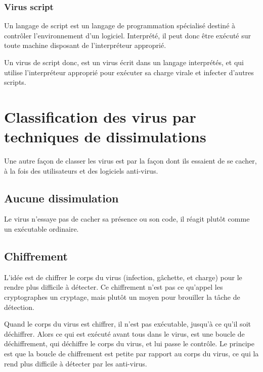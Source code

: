         \subsubsection{Virus script}
        Un langage de script est un langage de programmation spécialisé destiné à contrôler l'environnement 
        d'un logiciel. Interprété, il peut donc être exécuté sur toute machine disposant de l'interpréteur approprié. 

        Un virus de script donc, est un virus écrit dans un langage interprétés, et qui utilise l'interpréteur approprié
        pour exécuter sa charge virale et infecter d'autres scripts.

\section{Classification des virus par techniques de dissimulations}
Une autre façon de classer les virus est par la façon dont ils essaient de se cacher, 
à la fois des utilisateurs et des logiciels anti-virus.

    \subsection{Aucune dissimulation}
    Le virus n'essaye pas de cacher sa présence ou son code, il réagit plutôt comme un exécutable ordinaire.

    \subsection{Chiffrement}
    L'idée est de chiffrer le corps du virus (infection, gâchette, et charge) pour le rendre plus difficile à 
    détecter. Ce chiffrement n'est pas ce qu'appel les cryptographes un cryptage, mais plutôt un moyen pour
    brouiller la tâche de détection.

    Quand le corps du virus est chiffrer, il n'est pas exécutable, jusqu'à ce qu'il soit déchiffrer. Alors ce qui est 
    exécuté avant tous dans le virus, est une boucle de déchiffrement, qui déchiffre le corps du virus, et lui passe 
    le contrôle. Le principe est que la boucle de chiffrement est petite par rapport au corps du virus, ce qui la
    rend plus difficile à détecter par les anti-virus.

